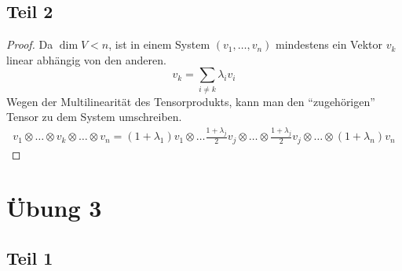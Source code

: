 \documentclass[10pt,a4paper]{article}
\begin{document}
\subsection*{Teil 2}

\begin{proof}
Da $\dim V < n$, ist in einem System $(v_{1}, \dots, v_{n})$ mindestens ein Vektor $v_{k}$ linear abhängig von den anderen.
\begin{equation}
v_{k} = \sum_{i \ne k} \lambda_{i} v_{i}
\end{equation}
Wegen der Multilinearität des Tensorprodukts, kann man den ``zugehörigen'' Tensor zu dem System umschreiben.
\begin{align*}
v_{1} \otimes \dots \otimes v_{k} \otimes \dots \otimes v_{n} = (1 + \lambda_{1})v_{1} \otimes \dots \frac{1 + \lambda_{j}}{2} v_{j} \otimes \dots \otimes \frac{1 + \lambda_{j}}{2} v_{j} \otimes \dots \otimes (1 + \lambda_{n})v_{n}
\end{align*}
\end{proof}

\section*{Übung 3}

\subsection*{Teil 1}
\end{document}
